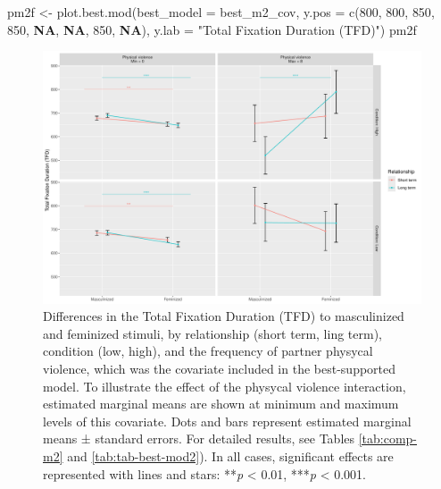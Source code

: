 \documentclass[
  bookmarksnumbered]{article}
\newenvironment{Shaded}{\begin{snugshade}}{\end{snugshade}}
\newcommand{\AttributeTok}[1]{\textcolor[rgb]{0.80,0.80,0.80}{#1}}
\newcommand{\ConstantTok}[1]{\textcolor[rgb]{0.86,0.64,0.64}{\textbf{#1}}}
\newcommand{\DecValTok}[1]{\textcolor[rgb]{0.86,0.86,0.80}{#1}}
\newcommand{\FunctionTok}[1]{\textcolor[rgb]{0.94,0.94,0.56}{#1}}
\newcommand{\NormalTok}[1]{\textcolor[rgb]{0.80,0.80,0.80}{#1}}
\newcommand{\OtherTok}[1]{\textcolor[rgb]{0.94,0.94,0.56}{#1}}
\newcommand{\StringTok}[1]{\textcolor[rgb]{0.80,0.58,0.58}{#1}}
\begin{document}
\begin{Shaded}
\begin{Highlighting}[]
\NormalTok{pm2f }\OtherTok{\textless{}{-}} \FunctionTok{plot.best.mod}\NormalTok{(}\AttributeTok{best\_model =}\NormalTok{ best\_m2\_cov, }
                      \AttributeTok{y.pos =} \FunctionTok{c}\NormalTok{(}\DecValTok{800}\NormalTok{, }\DecValTok{800}\NormalTok{, }\DecValTok{850}\NormalTok{, }\DecValTok{850}\NormalTok{, }\ConstantTok{NA}\NormalTok{, }\ConstantTok{NA}\NormalTok{, }\DecValTok{850}\NormalTok{, }\ConstantTok{NA}\NormalTok{),}
                      \AttributeTok{y.lab =} \StringTok{"Total Fixation Duration (TFD)"}\NormalTok{)}
\NormalTok{pm2f}
\end{Highlighting}
\end{Shaded}

\begin{figure}
\centering
\includegraphics{Supplementary_material_files/figure-latex/fig-mod2-cov-1.pdf}
\caption{\label{fig:fig-mod2-cov}Differences in the Total Fixation Duration (TFD) to masculinized and feminized stimuli, by relationship (short term, ling term), condition (low, high), and the frequency of partner physycal violence, which was the covariate included in the best-supported model. To illustrate the effect of the physycal violence interaction, estimated marginal means are shown at minimum and maximum levels of this covariate. Dots and bars represent estimated marginal means ± standard errors. For detailed results, see Tables \ref{tab:comp-m2} and \ref{tab:tab-best-mod2}). In all cases, significant effects are represented with lines and stars: **\emph{p} \textless{} 0.01, ***\emph{p} \textless{} 0.001.}
\end{figure}
\end{document}
